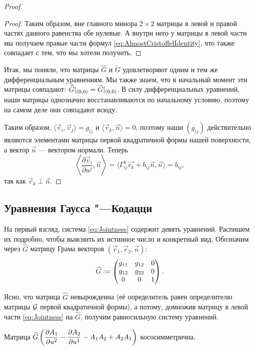 \begin{proof}
\begin{proof}
		Таким образом, вне главного минора $2 \times 2$ матрицы в левой и правой частях данного равенства обе нулевые. А внутри него у матрицы в левой части мы получаем правые части формул \eqref{eq:AlmostCristoffelIdentity}, что также совпадает с тем, что мы хотели получить.
	\end{proof}

	Итак, мы поняли, что матрицы $\widehat{G}$ и $\widetilde{G}$ удовлетворяют одним и тем же дифференциальным уравнениям. Мы также знаем, что в начальный момент эти матрицы совпадают: $\widehat{G}|_{(0, 0)} \hm= \widetilde{G}|_{(0, 0)}$. В силу дифференциальных уравнений, наши матрицы однозначно восстанавливаются по начальному условию, поэтому на самом деле они совпадают всюду.

	Таким образом, $\langle\vec{v}_i, \vec{v}_j\rangle = g_{ij}$ и $\langle\vec{v}_k, \vec{n}\rangle = 0$, поэтому наши $(g_{ij})$ действительно являются элементами матрицы первой квадратичной формы нашей поверхности, а вектор $\vec{n}$ --- вектором нормали. Теперь
	\[
		\left\langle\frac{\partial\vec{v}_i}{\partial u^j}, \vec{n}\right\rangle = \langle\Gamma_{ij}^k\vec{v_k} + b_{ij}\vec{n}, \vec{n}\rangle = b_{ij},
	\]
	так как $\vec{v}_k \perp \vec{n}$.
\end{proof}

\subsection{Уравнения Гаусса "---Кодацци}

На первый взгляд, система \eqref{eq:Jointness} содержит девять уравнений. Распишем их подробно, чтобы выяснить их истинное число и конкретный вид. Обозначим через $\widehat{G}$ матрицу Грама векторов $(\vec{r}_1, \vec{r}_2, \vec{n})$:
\[
	\widehat{G} \vcentcolon =
	\begin{pmatrix}
		g_{11} & g_{12} & 0\\
		g_{12} & g_{22} & 0\\
		0 & 0 & 1
	\end{pmatrix}.
\]

Ясно, что матрица $\widehat{G}$ невырожденна (её определитель равен определителю матрицы $\mathcal{G}$ первой квадратичной формы), а потому, домножив матрицу в левой части \eqref{eq:Jointness} на $\widehat{G}$, получим равносильную систему уравнений.

\begin{lemma}
	Матрица $\displaystyle\widehat{G}\left(\frac{\partial A_1}{\partial u^2} - \frac{\partial A_2}{\partial u^1} - A_1A_2 + A_2A_1\right)$ кососимметрична.
\end{lemma}

